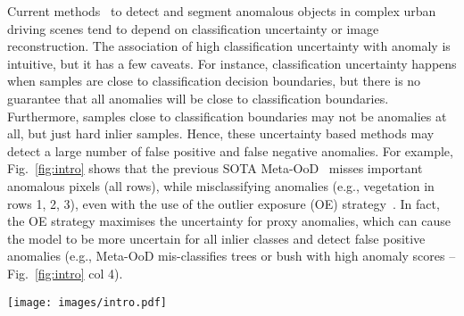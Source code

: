 \documentclass[runningheads]{llncs}
\begin{document}
Current methods~\cite{mukhoti2018evaluating,bevandic2019simultaneous,jung2021standardized,di2021pixel,chan2021entropy,xia2020synthesize,lis2019detecting,blum2019fishyscapes} to detect and segment anomalous objects in complex urban driving scenes tend to depend on classification uncertainty or image reconstruction. 
The association of high classification uncertainty with anomaly is intuitive, but it has a few caveats.  
For instance, classification uncertainty happens when samples are close to classification decision boundaries, but there is no guarantee that all anomalies will be close to classification boundaries.
Furthermore, samples close to classification boundaries may not be anomalies at all, but just hard inlier samples. Hence, these uncertainty based methods may detect a large number of false positive and false negative anomalies.
For example, Fig.~\ref{fig:intro} shows that the previous SOTA Meta-OoD~\cite{chan2021entropy} misses important anomalous pixels (all rows), while misclassifying anomalies (e.g., vegetation in rows 1, 2, 3), even with the use of the outlier exposure (OE) strategy~\cite{hendrycks2018deep}. In fact, the OE strategy maximises the uncertainty for proxy anomalies, which can cause the model to be more uncertain for all inlier classes and detect false positive anomalies (e.g., Meta-OoD mis-classifies trees or bush with high anomaly scores -- Fig.~\ref{fig:intro} col 4). 
\begin{figure*}[t!]
    \centering
    \texttt{[image: images/intro.pdf]}
    \vspace{-12pt}
    \vspace{-12pt}
    \label{fig:intro}
\end{figure*}
\end{document}
